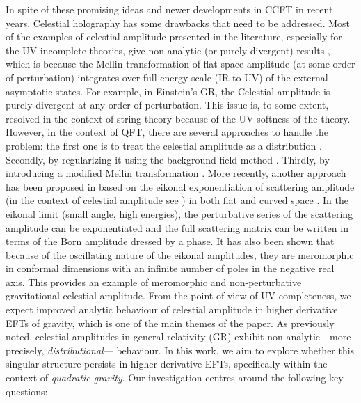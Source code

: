 \par 
In spite of these promising ideas and newer developments in CCFT in recent years, Celestial holography has some drawbacks that need to be addressed. Most of the examples of celestial amplitude presented in the literature, especially for the UV incomplete theories, give non-analytic (or purely divergent) results \cite{Arkani-Hamed:2020gyp}, which is because the Mellin transformation of flat space amplitude (at some order of perturbation) integrates over full energy scale (IR to UV) of the external asymptotic states. For example, in Einstein's GR, the Celestial amplitude is purely divergent at any order of perturbation. This issue is, to some extent, resolved in the context of string theory \cite{Stieberger:2018edy, Chang:2021wvv, Donnay:2023kvm} because of the UV softness of the theory. However, in the context of QFT, there are several approaches to handle the problem: the first one is to treat the celestial amplitude as a distribution \cite{Pasterski:2017ylz}. Secondly, by regularizing it using the background field method \cite{Fan:2022vbz,Casali:2022fro, Fan:2022kpp, deGioia:2022fcn, Banerjee:2023rni, Ball:2023ukj, Crawley:2023brz}. Thirdly, by introducing a modified Mellin transformation \cite{Banerjee:2019prz}. More recently, another approach has been proposed in \cite{Adamo:2024mqn} based on the eikonal exponentiation of scattering amplitude (in the context of celestial amplitude see \cite{deGioia:2022fcn}) in both flat and curved space \cite{Adamo:2021rfq}. In the eikonal limit (small angle, high energies), the perturbative series of the scattering amplitude can be exponentiated \cite{Amati:1987uf,Kabat:1992tb} and the full scattering matrix can be written in terms of the Born amplitude dressed by a phase. It has also been shown that because of the oscillating nature of the eikonal amplitudes, they are meromorphic in conformal dimensions with an infinite number of poles in the negative real axis. This provides an example of meromorphic and non-perturbative gravitational celestial amplitude. From the point of view of UV completeness, we expect improved analytic behaviour of celestial amplitude in higher derivative EFTs of gravity, which is one of the main themes of the paper. As previously noted, celestial amplitudes in general relativity (GR) exhibit non-analytic---more precisely, \textit{distributional}--- behaviour. In this work, we aim to explore whether this singular structure persists in higher-derivative EFTs, specifically within the context of \textit{quadratic gravity}. Our investigation centres around the following key questions:

